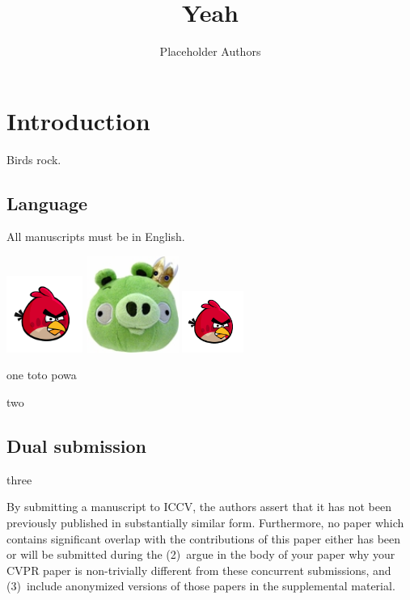 \documentclass[10pt,twocolumn,letterpaper]{article}
\begin{document}
\title{Yeah}

\author{Placeholder Authors}

\maketitle




\section{Introduction}

Birds rock.

\subsection{Language}

All manuscripts must be in English.

\includegraphics[width=2.5cm]{a_bird.png}
\includegraphics[width=3cm]{a_pig.png}
\includegraphics[width=2cm]{a_bird.png}

one
toto powa

two

\subsection{Dual submission}

three

By submitting a manuscript to ICCV, the authors assert that it has not been
previously published in substantially similar form. Furthermore, no paper
which contains significant overlap with the contributions of this paper
either has been or will be submitted during the
(2)~argue in the body of your paper why your CVPR paper is non-trivially
different from these concurrent submissions, and (3)~include anonymized
versions of those papers in the supplemental material.
\end{document}

